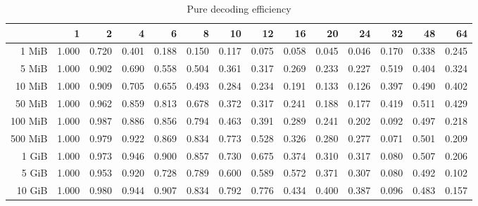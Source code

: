 \begin{table}[!h]
	\centering
	\caption{Pure decoding efficiency}
	\begin{tabular}{rrrrrrrrrrrrrr}
		\toprule
		\diagbox[width=7em]{Size}{Threads} &    1  &    2  &    4  &    6  &    8  &    10 &    12 &    16 &    20 &    24 &    32 &    48 &    64 \\
		\midrule
		1 MiB   & 1.000 & 0.720 & 0.401 & 0.188 & 0.150 & 0.117 & 0.075 & 0.058 & 0.045 & 0.046 & 0.170 & 0.338 & 0.245 \\
		5 MiB   & 1.000 & 0.902 & 0.690 & 0.558 & 0.504 & 0.361 & 0.317 & 0.269 & 0.233 & 0.227 & 0.519 & 0.404 & 0.324 \\
		10 MiB  & 1.000 & 0.909 & 0.705 & 0.655 & 0.493 & 0.284 & 0.234 & 0.191 & 0.133 & 0.126 & 0.397 & 0.490 & 0.402 \\
		50 MiB  & 1.000 & 0.962 & 0.859 & 0.813 & 0.678 & 0.372 & 0.317 & 0.241 & 0.188 & 0.177 & 0.419 & 0.511 & 0.429 \\
		100 MiB & 1.000 & 0.987 & 0.886 & 0.856 & 0.794 & 0.463 & 0.391 & 0.289 & 0.241 & 0.202 & 0.092 & 0.497 & 0.218 \\
		500 MiB & 1.000 & 0.979 & 0.922 & 0.869 & 0.834 & 0.773 & 0.528 & 0.326 & 0.280 & 0.277 & 0.071 & 0.501 & 0.209 \\
		1 GiB   & 1.000 & 0.973 & 0.946 & 0.900 & 0.857 & 0.730 & 0.675 & 0.374 & 0.310 & 0.317 & 0.080 & 0.507 & 0.206 \\
		5 GiB   & 1.000 & 0.953 & 0.920 & 0.728 & 0.789 & 0.600 & 0.589 & 0.572 & 0.371 & 0.307 & 0.080 & 0.492 & 0.102 \\
		10 GiB  & 1.000 & 0.980 & 0.944 & 0.907 & 0.834 & 0.792 & 0.776 & 0.434 & 0.400 & 0.387 & 0.096 & 0.483 & 0.157 \\
		\bottomrule
	\end{tabular}
\end{table}
